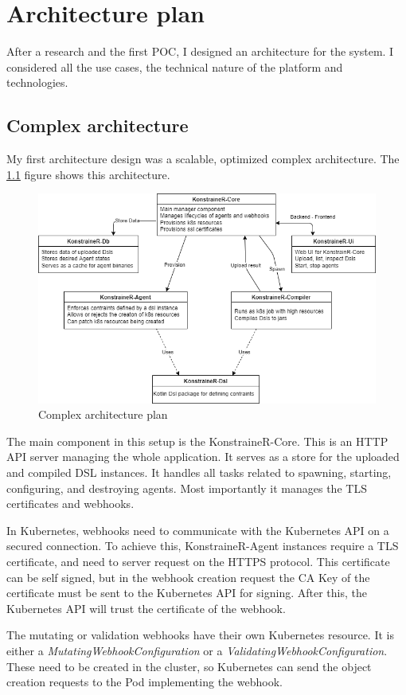 \setlength{\parindent}{0pt}
\setlength{\parskip}{0.6em}

\chapter{Architecture plan}
\label{sec:archPlan}

After a research and the first POC, I designed an architecture for the system. I considered all the use cases, the technical nature of the platform and technologies.

\section{Complex architecture}

My first architecture design was a scalable, optimized complex architecture. The \ref{fig:comp_arch} figure shows this architecture.

\begin{figure}[h]
    \centering
    \includegraphics[width=130mm, keepaspectratio]{content_real/25_archPlan/xarch.png}
    \caption{Complex architecture plan}
    \label{fig:comp_arch}
\end{figure}

The main component in this setup is the KonstraineR-Core. This is an HTTP API server managing the whole application. It serves as a store for the uploaded and compiled DSL instances. It handles all tasks related to spawning, starting, configuring, and destroying agents. Most importantly it manages the TLS certificates and webhooks. 

In Kubernetes, webhooks need to communicate with the Kubernetes API on a secured connection. To achieve this, KonstraineR-Agent instances require a TLS certificate, and need to server request on the HTTPS protocol. This certificate can be self signed, but in the webhook creation request the CA Key of the certificate must be sent to the Kubernetes API for signing. After this, the Kubernetes API will trust the certificate of the webhook.

The mutating or validation webhooks have their own Kubernetes resource. It is either a \emph{MutatingWebhookConfiguration} or a \emph{ValidatingWebhookConfiguration}. These need to be created in the cluster, so Kubernetes can send the object creation requests to the Pod implementing the webhook.


